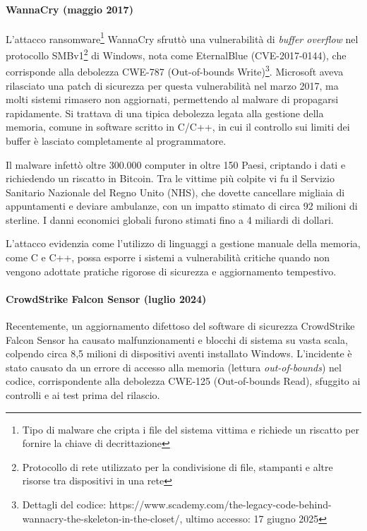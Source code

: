 \paragraph{WannaCry (maggio 2017)}

L'attacco ransomware\footnote{Tipo di malware che cripta i file del sistema
vittima e richiede un riscatto per fornire la chiave di decrittazione} WannaCry
sfruttò una vulnerabilità di \textit{buffer overflow} nel protocollo SMBv1\footnote{Protocollo
di rete utilizzato per la condivisione di file, stampanti e altre risorse tra dispositivi
in una rete} di Windows, nota come EternalBlue (CVE-2017-0144), che corrisponde
alla debolezza CWE-787 (Out-of-bounds Write)\footnote{Dettagli del codice: https://www.scademy.com/the-legacy-code-behind-wannacry-the-skeleton-in-the-closet/,
ultimo accesso: 17 giugno 2025}. Microsoft aveva rilasciato una patch di
sicurezza per questa vulnerabilità nel marzo 2017, ma molti sistemi rimasero non
aggiornati, permettendo al malware di propagarsi rapidamente. Si trattava di una
tipica debolezza legata alla gestione della memoria, comune in software scritto
in C/C++, in cui il controllo sui limiti dei buffer è lasciato completamente al programmatore.

Il malware infettò oltre 300.000 computer in oltre 150 Paesi, criptando i dati e
richiedendo un riscatto in Bitcoin. Tra le vittime più colpite vi fu il Servizio
Sanitario Nazionale del Regno Unito (NHS), che dovette cancellare migliaia di
appuntamenti e deviare ambulanze, con un impatto stimato di circa 92 milioni di sterline.
I danni economici globali furono stimati fino a 4 miliardi di dollari.\cite{wannacry_kaspersky}

L'attacco evidenzia come l'utilizzo di linguaggi a gestione manuale della memoria,
come C e C++, possa esporre i sistemi a vulnerabilità critiche quando non vengono
adottate pratiche rigorose di sicurezza e aggiornamento tempestivo.

\paragraph{CrowdStrike Falcon Sensor (luglio 2024)}

Recentemente, un aggiornamento difettoso del software di sicurezza CrowdStrike
Falcon Sensor ha causato malfunzionamenti e blocchi di sistema su vasta scala, colpendo
circa 8,5 milioni di dispositivi aventi installato Windows. L'incidente è stato
causato da un errore di accesso alla memoria (lettura \textit{out-of-bounds}) nel
codice, corrispondente alla debolezza CWE-125 (Out-of-bounds Read), sfuggito ai controlli
e ai test prima del rilascio.\cite{crowdstrike2024incident}

